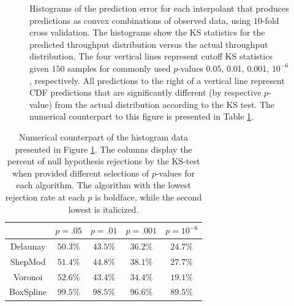 \documentclass[smallextended,final]{svjour3}  %
\begin{document}
\begin{figure}
  \centering
  \caption{Histograms of the prediction error for each interpolant
    that produces predictions as convex combinations of observed data,
    using $10$-fold cross validation. The histograms show the KS
    statistics for the predicted throughput distribution versus the
    actual throughput distribution. The four vertical lines represent
    cutoff KS statistics given $150$ samples for commonly used
    $p$-values 0.05, 0.01, 0.001, $10^{-6}$, respectively. All
    predictions to the right of a vertical line represent CDF
    predictions that are significantly different (by respective
    $p$-value) from the actual distribution according to the KS
    test. The numerical counterpart to this figure is presented in
    Table \ref{table:null-hypothesis-results}.}
  \label{fig:throughput-prediction}
\end{figure}

\begin{table}
  \renewcommand{\arraystretch}{1.3}
  \centering
  \begin{tabular}{c|c|c|c|c}
     & $p = .05$ & $p = .01$ & $p = .001$ & $p = 10^{-6}$\\
    \hline
    Delaunay & $\mathbf{50.3}\%$ & $\mathit{43.5}\%$ & $\mathit{36.2}\%$ & $\mathit{24.7}\%$\\
    ShepMod & $\mathit{51.4}\%$ & $44.8\%$ & $38.1\%$ & $27.7\%$\\
    Voronoi & $52.6\%$ & $\mathbf{43.4}\%$ & $\mathbf{34.4}\%$ & $\mathbf{19.1}\%$\\
    BoxSpline & $99.5\%$ & $98.5\%$ & $96.6\%$ & $89.5\%$\\
  \end{tabular}
  \caption{Numerical counterpart of the histogram data presented in
    Figure \ref{fig:throughput-prediction}. The columns display the
    percent of null hypothesis rejections by the KS-test when provided
    different selections of $p$-values for each algorithm. The
    algorithm with the lowest rejection rate at each $p$ is boldface,
    while the second lowest is italicized.}
  \label{table:null-hypothesis-results}
\end{table}
\end{document}
